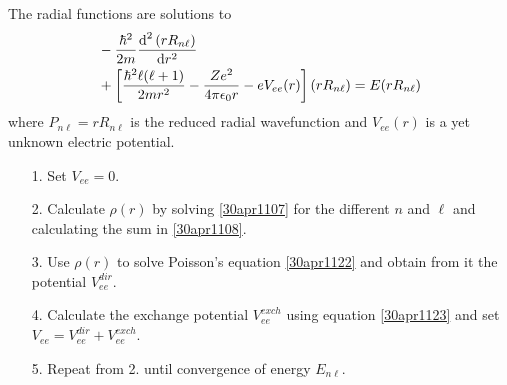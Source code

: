 \documentclass[twocolumn]{article}
\begin{document}
\begin{large}
The radial functions are solutions to 
\begin{equation}
    \label{30apr1107}
    \begin{split}
        &-\frac{\hbar^2}{2m}\frac{\text{d}^2\left(rR_{n\ell}\right)}{\text{d}r^2}  \\ 
        &\hspace{0.0cm} + \left[\frac{\hbar^2\ell(\ell+1)}{2mr^2}-\frac{Ze^2}{4\pi\epsilon_0r}-eV_{ee}(r)\right](rR_{n\ell}) = E(rR_{n\ell})  
    \end{split}
\end{equation}
where $P_{n\ell} = rR_{n\ell}$ is the reduced radial wavefunction and $V_{ee}(r)$ is a yet unknown electric potential. 

\begin{itemize}
    \item[1.] Set $V_{ee}=0$.
    \item[2.] Calculate $\rho(r)$ by solving \eqref{30apr1107} for the different $n$ and $\ell$ and calculating the sum in \eqref{30apr1108}.
    \item[3.] Use $\rho(r)$ to solve Poisson's equation \eqref{30apr1122} and obtain from it the potential $V_{ee}^{dir}$.
    \item[4.] Calculate the exchange potential $V_{ee}^{exch}$ using equation \eqref{30apr1123} and set $V_{ee} = V_{ee}^{dir} + V_{ee}^{exch}$. 
    \item[5.] Repeat from 2. until convergence of energy $E_{n\ell}$. 
\end{itemize}


\end{large}
\end{document}
